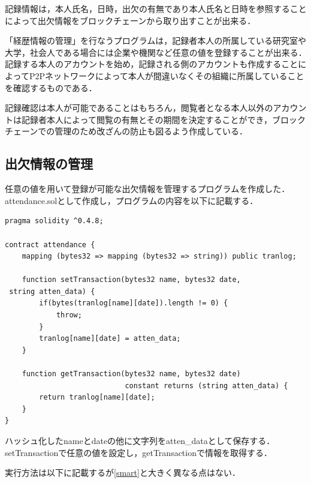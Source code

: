 記録情報は，本人氏名，日時，出欠の有無であり本人氏名と日時を参照することによって出欠情報をブロックチェーンから取り出すことが出来る．

「経歴情報の管理」を行なうプログラムは，記録者本人の所属している研究室や大学，社会人である場合には企業や機関など任意の値を登録することが出来る．記録する本人のアカウントを始め，記録される側のアカウントも作成することによってP2Pネットワークによって本人が間違いなくその組織に所属していることを確認するものである．

記録確認は本人が可能であることはもちろん，閲覧者となる本人以外のアカウントは記録者本人によって閲覧の有無とその期間を決定することができ，ブロックチェーンでの管理のため改ざんの防止も図るよう作成している．

\newpage

\subsection{出欠情報の管理}
任意の値を用いて登録が可能な出欠情報を管理するプログラムを作成した．attendance.solとして作成し，プログラムの内容を以下に記載する．
\begin{lstlisting}[basicstyle=\ttfamily\footnotesize, frame=single]
pragma solidity ^0.4.8;

contract attendance {
    mapping (bytes32 => mapping (bytes32 => string)) public tranlog;

    function setTransaction(bytes32 name, bytes32 date,
 string atten_data) {
        if(bytes(tranlog[name][date]).length != 0) {
            throw;
        }
        tranlog[name][date] = atten_data;
    }

    function getTransaction(bytes32 name, bytes32 date) 
                            constant returns (string atten_data) {
        return tranlog[name][date];
    }
}
\end{lstlisting}

ハッシュ化したnameとdateの他に文字列をatten\_dataとして保存する．setTransactionで任意の値を設定し，getTransactionで情報を取得する．

実行方法は以下に記載するが\ref{smart}と大きく異なる点はない．

